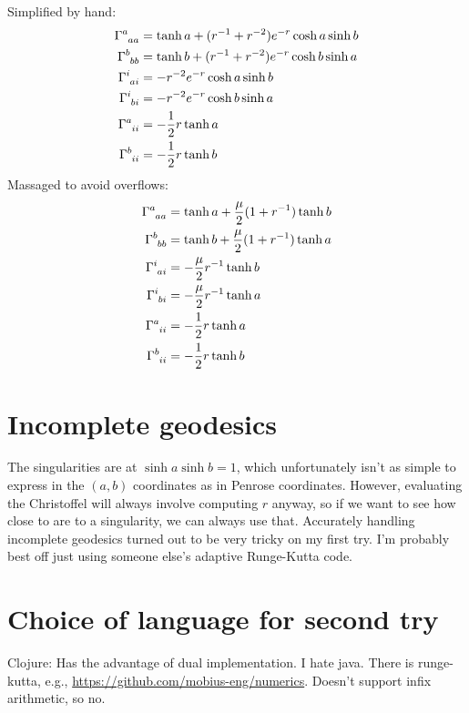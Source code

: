 \documentclass{article}
\begin{document}
Simplified by hand:
\begin{align*}
\Gamma\indices{^a_a_a} &= \tanh a + (r^{-1}+r^{-2})e^{-r}\cosh a\sinh b \\
\Gamma\indices{^b_b_b} &= \tanh b + (r^{-1}+r^{-2})e^{-r}\cosh b\sinh a \\
\Gamma\indices{^i_a_i} &= -r^{-2}e^{-r}\cosh a\sinh b  \\
\Gamma\indices{^i_b_i} &= -r^{-2}e^{-r}\cosh b\sinh a  \\
\Gamma\indices{^a_i_i} &= -\frac{1}{2}r\tanh a\\
\Gamma\indices{^b_i_i} &= -\frac{1}{2}r\tanh b
\end{align*}
Massaged to avoid overflows:
\begin{align*}
\Gamma\indices{^a_a_a} &= \tanh a + \frac{\mu}{2}(1+r^{-1})\tanh b \\
\Gamma\indices{^b_b_b} &= \tanh b + \frac{\mu}{2}(1+r^{-1})\tanh a \\
\Gamma\indices{^i_a_i} &= -\frac{\mu}{2}r^{-1}\tanh b  \\
\Gamma\indices{^i_b_i} &= -\frac{\mu}{2}r^{-1}\tanh a  \\
\Gamma\indices{^a_i_i} &= -\frac{1}{2}r\tanh a\\
\Gamma\indices{^b_i_i} &= -\frac{1}{2}r\tanh b
\end{align*}

\section{Incomplete geodesics}
The singularities are at $\sinh a\sinh b=1$, which unfortunately isn't as simple to express in the
$(a,b)$ coordinates as in Penrose coordinates. However, evaluating the Christoffel will always
involve computing $r$ anyway, so if we want to see how close to are to a singularity, we can always
use that. Accurately handling incomplete geodesics turned out to be very tricky on my first try.
I'm probably best off just using someone else's adaptive Runge-Kutta code.

\section{Choice of language for second try}
Clojure: Has the advantage of dual implementation. I hate java. There is runge-kutta, e.g.,
\url{https://github.com/mobius-eng/numerics}. Doesn't support infix arithmetic, so no.
\end{document}
